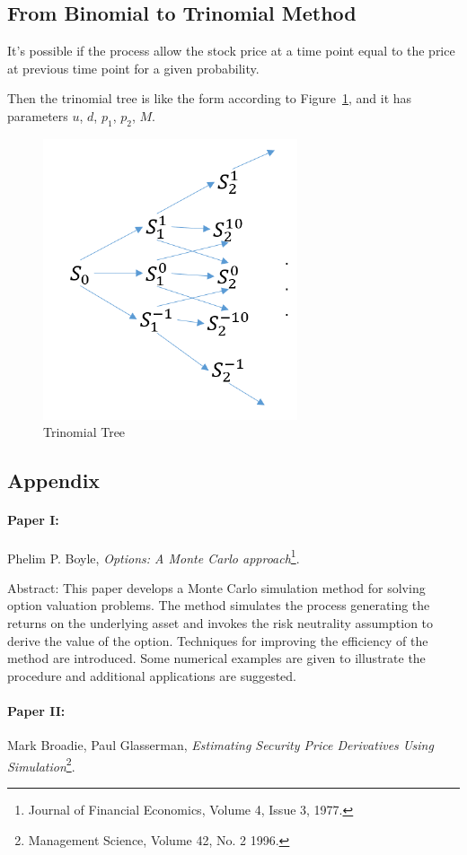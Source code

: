 \subsection{From Binomial to Trinomial Method}
It's possible if the process allow the stock price at a time point equal to the price at previous time point for a given probability.

Then the trinomial tree is like the form according to Figure~\ref{F:trinomial-tree}, and it has parameters $u$, $d$, $p_1$, $p_2$, $M$.
\begin{figure}
    \centering
    \includegraphics[width=.5\textwidth]{figures/2019-12-25-trinomial-tree.png}
    \caption{Trinomial Tree}\label{F:trinomial-tree}
\end{figure}


\subsection{Appendix}
\paragraph{Paper I:} Phelim P. Boyle, \emph{Options: A Monte Carlo approach}\footnote{Journal of Financial Economics, Volume 4, Issue 3, 1977.}.

Abstract: This paper develops a Monte Carlo simulation method for solving option valuation problems. The method simulates the process generating the returns on the underlying asset and invokes the risk neutrality assumption to derive the value of the option. Techniques for improving the efficiency of the method are introduced. Some numerical examples are given to illustrate the procedure and additional applications are suggested.

\paragraph{Paper II:} Mark Broadie, Paul Glasserman, \emph{Estimating Security Price Derivatives Using Simulation}\footnote{Management Science, Volume 42, No. 2 1996.}.

